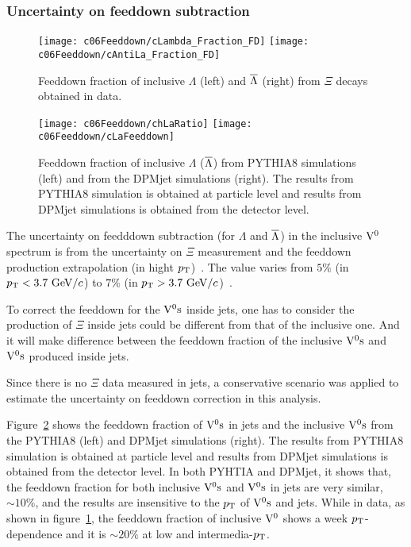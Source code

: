 \subsubsection{Uncertainty on feeddown subtraction}
\label{sec:c06SystFd}

\begin{figure}[htb]
\begin{center}
\texttt{[image: c06Feeddown/cLambda\_Fraction\_FD]}
\texttt{[image: c06Feeddown/cAntiLa\_Fraction\_FD]}
\caption{Feeddown fraction of inclusive $\Lambda$ (left) and $\overline{\Lambda}$ (right)
         from $\Xi$ decays obtained in data.}
\label{fig:c05FractionFd}
\end{center}
\end{figure}

\begin{figure}[htb]
\begin{center}
\texttt{[image: c06Feeddown/chLaRatio]}
\texttt{[image: c06Feeddown/cLaFeeddown]}
\caption{Feeddown fraction of inclusive $\Lambda$ ($\overline{\Lambda}$) from PYTHIA8
         simulations (left) and from the DPMjet simulations (right).
         The results from PYTHIA8 simulation is obtained at particle level and
         results from DPMjet simulations is obtained from the detector level.}
\label{fig:c05FractionFdSim}
\end{center}
\end{figure}

The uncertainty on feedddown subtraction (for $\Lambda$ and $\overline{\Lambda}$) in
the inclusive ${\rm V}^{0}$ spectrum is from the uncertainty on $\Xi$ measurement
and the feeddown production
extrapolation (in hight $p_{\rm T}$)~\cite{Ali2012:ana501,Ali2013:ana702}.
The value varies from $5\%$ (in $p_{\rm T}<3.7~{\rm GeV}/c$)
to $7\%$ (in $p_{\rm T}>3.7~{\rm GeV}/c$)~\cite{Ali2013:ana702}.

To correct the feeddown for the ${\rm V}^{0}{\rm s}$ inside jets,
one has to consider the production of $\Xi$ inside jets could be
different from that of the inclusive one.
And it will make difference between the feeddown fraction of the
inclusive ${\rm V}^{0}{\rm s}$ and ${\rm V}^{0}{\rm s}$ produced inside jets.

Since there is no $\Xi$ data measured in jets,
a conservative scenario was applied to estimate the uncertainty on
feeddown correction in this analysis.

Figure~\ref{fig:c05FractionFdSim} shows the feeddown fraction of ${\rm V}^{0}{\rm s}$ in
jets and the inclusive ${\rm V}^{0}{\rm s}$ from the PYTHIA8 (left) and DPMjet
simulations (right).
The results from PYTHIA8 simulation is obtained at particle level and
results from DPMjet simulations is obtained from the detector level.
In both PYHTIA and DPMjet, it shows that, the feeddown fraction for both
inclusive ${\rm V}^{0}{\rm s}$ and ${\rm V}^{0}{\rm s}$ in jets are very similar, $\sim 10\%$,
and the results are insensitive to the $p_{\rm T}$ of ${\rm V}^{0}{\rm s}$ and jets.
While in data, as shown in figure~\ref{fig:c05FractionFd},
the feeddown fraction of inclusive ${\rm V}^{0}$ shows a week $p_{\rm T}$-dependence
and it is $\sim 20\%$ at low and intermedia-$p_{\rm T}$.

